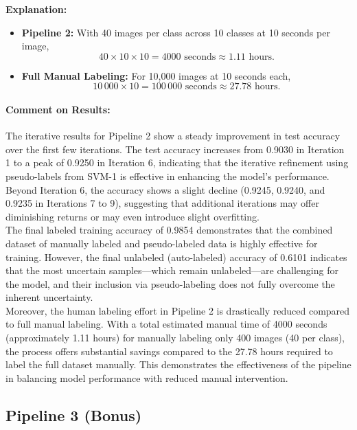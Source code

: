 \documentclass[12pt]{article}
\begin{document}
\begin{enumerate}
    \noindent
    \newpage
    \textbf{Explanation:} 
    \begin{itemize}
        \item \textbf{Pipeline 2:}  
        With 40 images per class across 10 classes at 10 seconds per image,
        \[
        40 \times 10 \times 10 = 4000 \text{ seconds} \approx 1.11 \text{ hours}.
        \]
        \item \textbf{Full Manual Labeling:}  
        For 10,000 images at 10 seconds each,
        \[
        10\,000 \times 10 = 100\,000 \text{ seconds} \approx 27.78 \text{ hours}.
        \]
    \end{itemize}
\end{enumerate}

\paragraph{Comment on Results:}
The iterative results for Pipeline 2 show a steady improvement in test accuracy over the first few iterations. The test accuracy increases from 0.9030 in Iteration 1 to a peak of 0.9250 in Iteration 6, indicating that the iterative refinement using pseudo-labels from SVM-1 is effective in enhancing the model's performance. Beyond Iteration 6, the accuracy shows a slight decline (0.9245, 0.9240, and 0.9235 in Iterations 7 to 9), suggesting that additional iterations may offer diminishing returns or may even introduce slight overfitting.\\
The final labeled training accuracy of 0.9854 demonstrates that the combined dataset of manually labeled and pseudo-labeled data is highly effective for training. However, the final unlabeled (auto-labeled) accuracy of 0.6101 indicates that the most uncertain samples—which remain unlabeled—are challenging for the model, and their inclusion via pseudo-labeling does not fully overcome the inherent uncertainty.\\
Moreover, the human labeling effort in Pipeline 2 is drastically reduced compared to full manual labeling. With a total estimated manual time of 4000 seconds (approximately 1.11 hours) for manually labeling only 400 images (40 per class), the process offers substantial savings compared to the 27.78 hours required to label the full dataset manually. This demonstrates the effectiveness of the pipeline in balancing model performance with reduced manual intervention.



\subsection*{Pipeline 3 (Bonus)}
\end{document}
